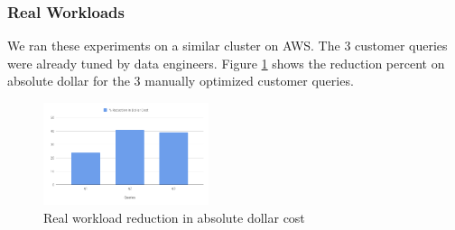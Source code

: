 \subsubsection*{Real Workloads}
We ran these experiments on a similar cluster on AWS. The 3 customer queries were already tuned by data engineers. Figure \ref{fig:modelbaseddollarresult} shows the reduction percent on absolute dollar for the 3 manually optimized customer queries. 

\begin{figure}[h]
	\centering\includegraphics[height=3cm]{ModelExp.png}
	\caption{Real workload reduction in absolute dollar cost}
	\label{fig:modelbaseddollarresult}
\end{figure}
